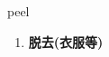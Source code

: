 
\begin{frame}
{\huge peel}
\begin{center}
\begin{enumerate}\Large
  \item \textbf{脱去(衣服等)}
\end{enumerate}
\end{center}
\end{frame}
